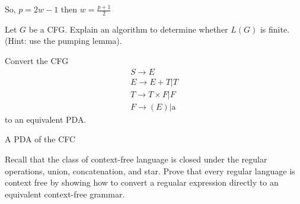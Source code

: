 \documentclass[12pt]{exam}
\begin{document}
\begin{questions}
\begin{solution}
    So, $p = 2w-1$ then $w = \frac{p+1}{2}$



  \end{solution}

  \question{} Let $G$ be a CFG. Explain an algorithm to determine whether $L(G)$ is finite. (Hint: use the pumping lemma).

  \question{} Convert the CFG
  \begin{gather*}
  S\to E\\
    E\to E+T|T\\
    T\to T \times F|F\\
    F\to (E)|\text{a}
    \end{gather*}
  to an equivalent PDA.

  \begin{solution}

    A PDA of the CFC


  \end{solution}


  \question{} Recall that the class of context-free language is closed under the regular operations, union, concatenation, and star. Prove that every regular language is context free by showing how to convert a regualar expression directly to an equivalent context-free grammar.


\end{questions}
\end{document}
